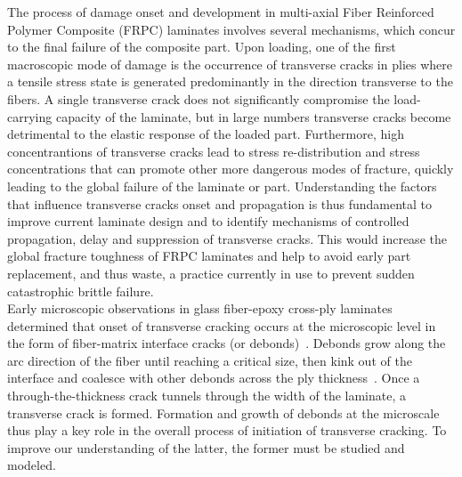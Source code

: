\documentclass[smallextended]{svjour3}       %
\begin{document}
The process of damage onset and development in multi-axial Fiber Reinforced Polymer Composite (FRPC) laminates involves several mechanisms, which concur to the final failure of the composite part. Upon loading, one of the first macroscopic mode of damage is the occurrence of transverse cracks in plies where a tensile stress state is generated predominantly in the direction transverse to the fibers. A single transverse crack does not significantly compromise the load-carrying capacity of the laminate, but in large numbers transverse cracks become detrimental to the elastic response of the loaded part. Furthermore, high concentrantions of transverse cracks lead to stress re-distribution and stress concentrations that can promote other more dangerous modes of fracture, quickly leading to the global failure of the laminate or part. Understanding the factors that influence transverse cracks onset and propagation is thus fundamental to improve current laminate design and to identify mechanisms of controlled propagation, delay and suppression of transverse cracks. This would increase the global fracture toughness of FRPC laminates and help to avoid early part replacement, and thus waste, a practice currently in use to prevent sudden catastrophic brittle failure.\\
Early microscopic observations in glass fiber-epoxy cross-ply laminates determined that onset of transverse cracking occurs at the microscopic level in the form of fiber-matrix interface cracks (or debonds)~\cite{Bailey1981}. Debonds grow along the arc direction of the fiber until reaching a critical size, then kink out of the interface and coalesce with other debonds across the ply thickness~\cite{Zhang1997}. Once a through-the-thickness crack tunnels through the width of the laminate, a transverse crack is formed. Formation and growth of debonds at the microscale thus play a key role in the overall process of initiation of transverse cracking. To improve our understanding of the latter, the former must be studied and modeled.\\
\end{document}
